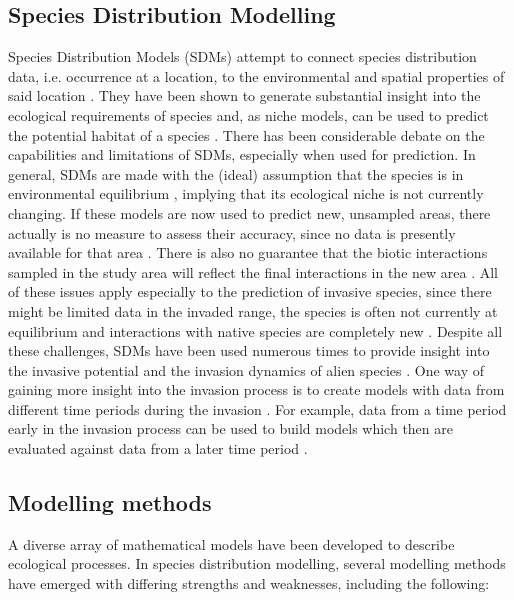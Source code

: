 \documentclass[12pt,a4paper]{article}
\begin{document}
\subsection{Species Distribution Modelling}
Species Distribution Models (SDMs) attempt to connect species distribution data, i.e. occurrence at a location, to the environmental and spatial properties of said location \autocite{elith2009sdmtheory}.
They have been shown to generate substantial insight into the ecological requirements of species and, as niche models, can be used to predict the potential habitat of a species \autocite{araujo2006sdmchallenges}.
There has been considerable debate on the capabilities and limitations of SDMs, especially when used for prediction.
In general, SDMs are made with the (ideal) assumption that the species is in environmental equilibrium \autocite{elith2009sdmtheory}, implying that its ecological niche is not currently changing.
If these models are now used to predict new, unsampled areas, there actually is no measure to assess their accuracy, since no data is presently available for that area \autocite{araujo2006sdmchallenges}.
There is also no guarantee that the biotic interactions sampled in the study area will reflect the final interactions in the new area \autocite{elith2009sdmtheory}.
All of these issues apply especially to the prediction of invasive species, since there might be limited data in the invaded range, the species is often not currently at equilibrium and interactions with native species are completely new \autocite{mainali2015sdmprojecting}.
Despite all these challenges, SDMs have been used numerous times to provide insight into the invasive potential and the invasion dynamics of alien species \autocite{zimmermann2010sdmtrends}.
One way of gaining more insight into the invasion process is to create models with data from different time periods during the invasion \autocite{briscoe2019palmerisdm}.
For example, data from a time period early in the invasion process can be used to build models which then are evaluated against data from a later time period \autocite{barbet2018nigrithoraxsdm}.

\subsection{Modelling methods}
A diverse array of mathematical models have been developed to describe ecological processes.
In species distribution modelling, several modelling methods have emerged with differing strengths and weaknesses, including the following:
\end{document}

